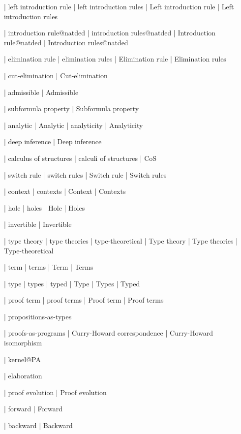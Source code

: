  | left introduction rule
 | left introduction rules
 | Left introduction rule
 | Left introduction rules

 | introduction rule@natded
 | introduction rules@natded
 | Introduction rule@natded
 | Introduction rules@natded

 | elimination rule
 | elimination rules
 | Elimination rule
 | Elimination rules

 | cut-elimination
 | Cut-elimination

 | admissible
 | Admissible

 | subformula property
 | Subformula property

 | analytic
 | Analytic
 | analyticity
 | Analyticity

 | deep inference
 | Deep inference

 | calculus of structures
 | calculi of structures
 | CoS
 
 | switch rule
 | switch rules
 | Switch rule
 | Switch rules
 
 | context
 | contexts
 | Context
 | Contexts

 | hole
 | holes
 | Hole
 | Holes

 | invertible
 | Invertible

 | type theory
 | type theories
 | type-theoretical
 | Type theory
 | Type theories
 | Type-theoretical

 | term
 | terms
 | Term
 | Terms

 | type
 | types
 | typed
 | Type
 | Types
 | Typed

 | proof term
 | proof terms
 | Proof term
 | Proof terms

 | propositions-as-types

 | proofs-as-programs
 | Curry-Howard correspondence
 | Curry-Howard isomorphism

 | kernel@PA

 | elaboration

 | proof evolution
 | Proof evolution

 | forward
 | Forward

 | backward
 | Backward
 
